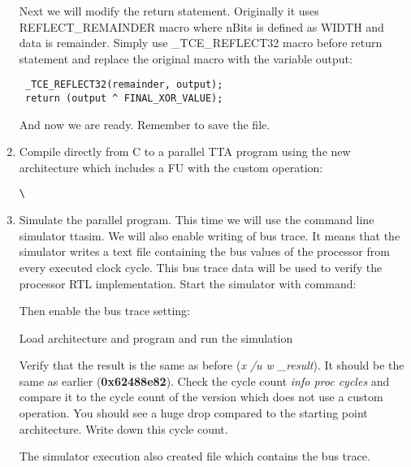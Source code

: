 \documentclass[twoside]{tceusermanual}
\begin{document}
\begin{enumerate}
Next we will modify the return statement. Originally it uses
REFLECT\_REMAINDER macro where nBits is defined as WIDTH and data is
remainder. Simply use \_TCE\_REFLECT32 macro before return statement and
replace the original macro with the variable output:

\begin{verbatim}
 _TCE_REFLECT32(remainder, output);
 return (output ^ FINAL_XOR_VALUE);
\end{verbatim}

And now we are ready. Remember to save the file.

\item%
Compile directly from C to a parallel TTA program using the new architecture
which includes a FU with the custom operation:

\verb#\#\\

\item%
Simulate the parallel program. This time we will use the command line simulator
ttasim. We will also enable writing of bus trace. It means that the simulator
writes a text file containing the bus values of the processor from every
executed clock cycle. This bus trace data will be used to verify the processor
RTL implementation. Start the simulator with command:


Then enable the bus trace setting:


Load architecture and program and run the simulation




Verify that the result is the same as before (\textit{x /u w \_result}). It
should be the same as earlier (\textbf{0x62488e82}).
Check the cycle count \textit{info proc cycles} and compare it to the cycle 
count of the version which does not use a custom operation. You should see 
a huge drop compared to the starting point architecture. Write down this cycle
count.

The simulator execution also created file 
which contains the bus trace.

\end{enumerate}
\end{document}
